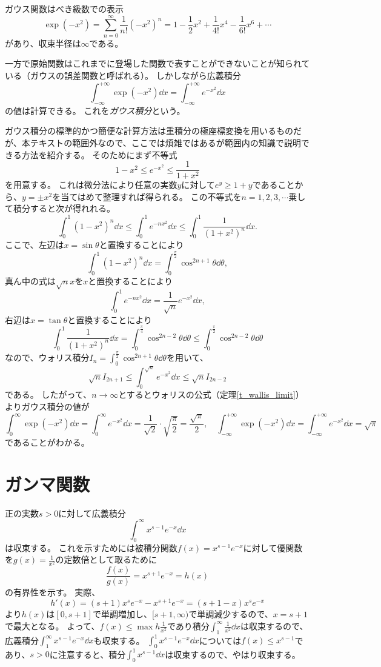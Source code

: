 ガウス関数はべき級数での表示
$$
\exp(-x^2) = \sum_{n = 0}^\infty \frac{1}{n!}(-x^2)^n = 1-\frac{1}{2}x^2+\frac{1}{4!}x^4-\frac{1}{6!}x^6+\cdots
$$
があり、収束半径は$\infty$である。

一方で原始関数はこれまでに登場した関数で表すことができないことが知られている（ガウスの誤差関数と呼ばれる）。
しかしながら広義積分
$$
\int_{-\infty}^{+\infty}\exp(-x^2)\dd{x} = \int_{-\infty}^{+\infty} e^{-x^2}\dd{x}
$$
の値は計算できる。
これを\emph{ガウス積分}という。

ガウス積分の標準的かつ簡便な計算方法は重積分の極座標変換を用いるものだが、本テキストの範囲外なので、ここでは煩雑ではあるが範囲内の知識で説明できる方法を紹介する。
そのためにまず不等式
$$
1-x^2 \le e^{-x^2} \le \frac{1}{1+x^2}
$$
を用意する。
これは微分法により任意の実数$y$に対して$e^y \ge 1+y$であることから、$y = \pm x^2$を当てはめて整理すれば得られる。
この不等式を$n = 1, 2, 3, \cdots$乗して積分すると次が得れれる。
$$
\int_0^1 (1-x^2)^n\dd{x} \le \int_0^1 e^{-n x^2}\dd{x} \le \int_0^1 \frac{1}{(1+x^2)^n}\dd{x}.
$$
ここで、左辺は$x = \sin\theta$と置換することにより
$$
\int_0^1 (1-x^2)^n\dd{x} = \int_0^{\frac{\pi}{2}} \cos^{2 n+1}\theta\dd{\theta},
$$
真ん中の式は$\sqrt{n}x$を$x$と置換することにより
$$
\int_0^1 e^{-n x^2}\dd{x} = \frac{1}{\sqrt{n}} e^{-x^2}\dd{x},
$$
右辺は$x = \tan\theta$と置換することにより
$$
\int_0^1 \frac{1}{(1+x^2)^n}\dd{x} = \int_0^{\frac{\pi}{4}} \cos^{2 n-2}\theta\dd{\theta} \le \int_0^{\frac{\pi}{2}} \cos^{2 n-2}\theta\dd{\theta}
$$
なので、ウォリス積分$I_n = \int_0^{\frac{\pi}{2}} \cos^{2 n+1}\theta\dd{\theta}$を用いて、
$$
\sqrt{n}I_{2 n+1} \le \int_0^{\sqrt{n}} e^{-x^2}\dd{x} \le \sqrt{n}I_{2 n-2}
$$
である。
したがって、$n \to \infty$とするとウォリスの公式（定理\ref{t_wallis_limit}）よりガウス積分の値が
$$
\int_0^\infty \exp(-x^2)\dd{x} = \int_0^\infty e^{-x^2}\dd{x} = \frac{1}{\sqrt{2}}\cdot\sqrt{\frac{\pi}{2}} = \frac{\sqrt{\pi}}{2},
\quad \int_{-\infty}^{+\infty} \exp(-x^2)\dd{x} = \int_{-\infty}^{+\infty} e^{-x^2}\dd{x} = \sqrt{\pi}
$$
であることがわかる。

\section{ガンマ関数}

正の実数$s > 0$に対して広義積分
$$
\int_0^\infty x^{s-1}e^{-x}\dd{x}
$$
は収束する。
これを示すためには被積分関数$f(x) = x^{s-1}e^{-x}$に対して優関数を$g(x) = \frac{1}{x^2}$の定数倍として取るために
$$
\frac{f(x)}{g(x)} = x^{s+1}e^{-x} = h(x)
$$
の有界性を示す。
実際、
$$
h'(x) = (s+1)x^s e^{-x}-x^{s+1}e^{-x} = (s+1-x)x^s e^{-x}
$$
より$h(x)$は$[0, s+1]$で単調増加し、$[s+1, \infty)$で単調減少するので、$x = s+1$で最大となる。
よって、$f(x) \le \max h \frac{1}{x^2}$であり積分$\int_1^\infty \frac{1}{x^2}\dd{x}$は収束するので、広義積分$\int_1^\infty x^{s-1}e^{-x}\dd{x}$も収束する。
$\int_0^1 x^{s-1}e^{-x}\dd{x}$については$f(x) \le x^{s-1}$であり、$s > 0$に注意すると、積分$\int_0^1 x^{s-1}\dd{x}$は収束するので、やはり収束する。

